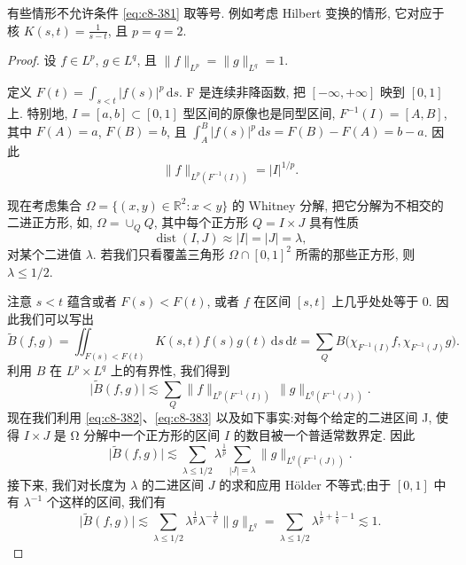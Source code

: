 \begin{remark}\label{rem:c8-0.58}
有些情形不允许条件 \eqref{eq:c8-381} 取等号. 例如考虑 Hilbert 变换的情形, 它对应于核 $K(s, t)=\frac{1}{s-t}$, 且 $p=q=2$. 
\end{remark}

\begin{proof}
设 $f\in L^p$, $g\in L^q$, 且 $\|f\|_{L^p}=\|g\|_{L^q}=1$. 

定义 $F(t)=\int_{s<t}|f(s)|^p\, \mathrm{d}s$. F 是连续非降函数, 把 $[-\infty, +\infty]$ 映到 $[0, 1]$ 上. 特别地, $I=[a, b]\subset[0, 1]$ 型区间的原像也是同型区间, $F^{-1}(I)=[A, B]$, 其中 $F(A)=a$, $F(B)=b$, 且 $\int_A^B|f(s)|^p\, \mathrm{d}s=F(B)-F(A)=b-a$. 因此
\begin{equation}
\|f\|_{L^p(F^{-1}(I))}=|I|^{1/p}.\label{eq:c8-382}
\end{equation}

现在考虑集合 $\Omega=\{(x, y)\in\mathbb{R}^2:x<y\}$ 的 Whitney 分解, 把它分解为不相交的二进正方形, 如, $\Omega=\cup_Q Q$, 其中每个正方形 $Q=I\times J$ 具有性质
\begin{equation}
\operatorname{dist}(I, J)\approx|I|=|J|=\lambda, \label{eq:c8-383}
\end{equation}
对某个二进值 $\lambda$. 若我们只看覆盖三角形 $\Omega\cap[0, 1]^2$ 所需的那些正方形, 则 $\lambda\leq1/2$. 

注意 $s<t$ 蕴含或者 $F(s)<F(t)$, 或者 $f$ 在区间 $[s, t]$ 上几乎处处等于 0. 因此我们可以写出
\[
\widetilde{B}(f, g)=\iint_{F(s)<F(t)}K(s, t)f(s)g(t)\, \mathrm{d}s\, \mathrm{d}t
=\sum_Q B\bigl(\chi_{F^{-1}(I)}f, \chi_{F^{-1}(J)}g\bigr).
\]
利用 $B$ 在 $L^p\times L^q$ 上的有界性, 我们得到
\[
\bigl|\widetilde{B}(f, g)\bigr|\lesssim\sum_Q\|f\|_{L^p(F^{-1}(I))}\, \|g\|_{L^q(F^{-1}(J))}.
\]
现在我们利用 \eqref{eq:c8-382}、\eqref{eq:c8-383} 以及如下事实:对每个给定的二进区间 J, 使得 $I\times J$ 是 Ω 分解中一个正方形的区间 $I$ 的数目被一个普适常数界定. 因此
\[
\bigl|\widetilde{B}(f, g)\bigr|\lesssim\sum_{\lambda\leq1/2}\lambda^{\frac{1}{p}}\sum_{|J|=\lambda}\|g\|_{L^q(F^{-1}(J))}.
\]
接下来, 我们对长度为 $\lambda$ 的二进区间 $J$ 的求和应用 Hölder 不等式;由于 $[0, 1]$ 中有 $\lambda^{-1}$ 个这样的区间, 我们有
\[
\bigl|\widetilde{B}(f, g)\bigr|\lesssim\sum_{\lambda\leq1/2}\lambda^{\frac{1}{p}}\lambda^{-\frac{1}{q'}}\|g\|_{L^q}
=\sum_{\lambda\leq1/2}\lambda^{\frac{1}{p}+\frac{1}{q}-1}\lesssim1 .
\]
\end{proof}
